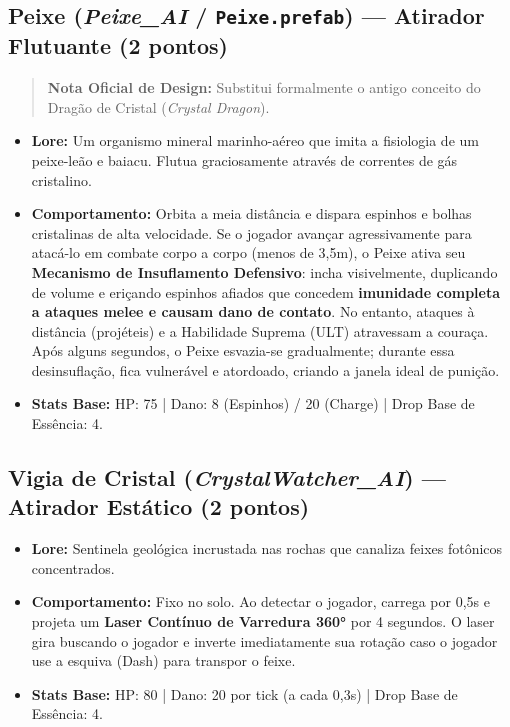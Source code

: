\documentclass[a4paper,12pt]{report}
\begin{document}
\subsection{Peixe (\textit{Peixe\_AI} / \texttt{Peixe.prefab}) --- Atirador Flutuante (2 pontos)}
\begin{quote}
    \textbf{Nota Oficial de Design:} Substitui formalmente o antigo conceito do Dragão de Cristal (\textit{Crystal Dragon}).
\end{quote}
\begin{itemize}
    \item \textbf{Lore:} Um organismo mineral marinho-aéreo que imita a fisiologia de um peixe-leão e baiacu. Flutua graciosamente através de correntes de gás cristalino.
    \item \textbf{Comportamento:} Orbita a meia distância e dispara espinhos e bolhas cristalinas de alta velocidade. Se o jogador avançar agressivamente para atacá-lo em combate corpo a corpo (menos de 3,5m), o Peixe ativa seu \textbf{Mecanismo de Insuflamento Defensivo}: incha visivelmente, duplicando de volume e eriçando espinhos afiados que concedem \textbf{imunidade completa a ataques melee e causam dano de contato}. No entanto, ataques à distância (projéteis) e a Habilidade Suprema (ULT) atravessam a couraça. Após alguns segundos, o Peixe esvazia-se gradualmente; durante essa desinsuflação, fica vulnerável e atordoado, criando a janela ideal de punição.
    \item \textbf{Stats Base:} HP: 75 | Dano: 8 (Espinhos) / 20 (Charge) | Drop Base de Essência: 4.
\end{itemize}

\subsection{Vigia de Cristal (\textit{CrystalWatcher\_AI}) --- Atirador Estático (2 pontos)}
\begin{itemize}
    \item \textbf{Lore:} Sentinela geológica incrustada nas rochas que canaliza feixes fotônicos concentrados.
    \item \textbf{Comportamento:} Fixo no solo. Ao detectar o jogador, carrega por 0,5s e projeta um \textbf{Laser Contínuo de Varredura 360°} por 4 segundos. O laser gira buscando o jogador e inverte imediatamente sua rotação caso o jogador use a esquiva (Dash) para transpor o feixe.
    \item \textbf{Stats Base:} HP: 80 | Dano: 20 por tick (a cada 0,3s) | Drop Base de Essência: 4.
\end{itemize}
\end{document}
